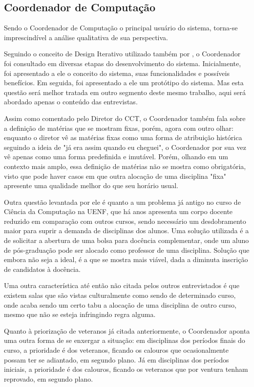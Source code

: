     \subsection{Coordenador de Computação} %

        Sendo o Coordenador de Computação o principal usuário do sistema, torna-se imprescindível a análise qualitativa de sua perspectiva.

        Seguindo o conceito de Design Iterativo utilizado também por \cite{andre_interaction_2018}, o Coordenador foi consultado em diversas etapas do desenvolvimento do sistema. Inicialmente, foi apresentado a ele o conceito do sistema, suas funcionalidades e possíveis benefícios. Em seguida, foi apresentado a ele um protótipo do sistema. Mas esta questão será melhor tratada em outro segmento deste mesmo trabalho, aqui será abordado apenas o conteúdo das entrevistas.

        Assim como comentado pelo Diretor do CCT, o Coordenador também fala sobre a definição de matérias que se mostram fixas, porém, agora com outro olhar: enquanto o diretor vê as matérias fixas como uma forma de atribuição histórica seguindo a ideia de "já era assim quando eu cheguei", o Coordenador por sua vez vê apenas como uma forma predefinida e imutável. Porém, olhando em um contexto mais amplo, essa definição de matérias não se mostra como obrigatória, visto que pode haver casos em que outra alocação de uma disciplina "fixa" apresente uma qualidade melhor do que seu horário usual.

        Outra questão levantada por ele é quanto a um problema já antigo no curso de Ciência da Computação na UENF, que há anos apresenta um corpo docente reduzido em comparação com outros cursos, sendo necessário um desdobramento maior para suprir a demanda de disciplinas dos alunos. Uma solução utilizada é a de solicitar a abertura de uma bolsa para docência complementar, onde um aluno de pós-graduação pode ser alocado como professor de uma disciplina. Solução que embora não seja a ideal, é a que se mostra mais viável, dada a diminuta inscrição de candidatos à docência.

        Uma outra característica até então não citada pelos outros entrevistados é que existem salas que são vistas culturalmente como sendo de determinado curso, onde acaba sendo um certo tabu a alocação de uma disciplina de outro curso, mesmo que não se esteja infringindo regra alguma.

        Quanto à priorização de veteranos já citada anteriormente, o Coordenador aponta uma outra forma de se enxergar a situação: em disciplinas dos períodos finais do curso, a prioridade é dos veteranos, ficando os calouros que ocasionalmente possam ter se adiantado, em segundo plano. Já em disciplinas dos períodos iniciais, a prioridade é dos calouros, ficando os veteranos que por ventura tenham reprovado, em segundo plano.


